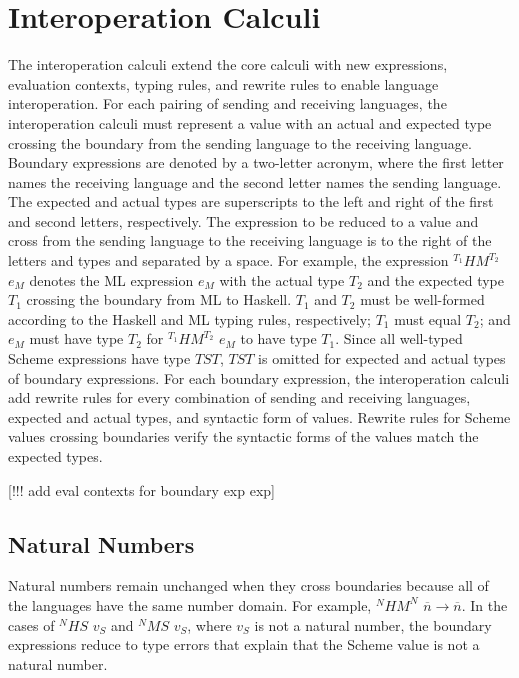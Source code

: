 









\section{Interoperation Calculi}

The interoperation calculi extend the core calculi with new expressions, evaluation contexts, typing rules, and rewrite rules to enable language interoperation.  For each pairing of sending and receiving languages, the interoperation calculi must represent a value with an actual and expected type crossing the boundary from the sending language to the receiving language.  Boundary expressions are denoted by a two-letter acronym, where the first letter names the receiving language and the second letter names the sending language.  The expected and actual types are superscripts to the left and right of the first and second letters, respectively.  The expression to be reduced to a value and cross from the sending language to the receiving language is to the right of the letters and types and separated by a space.  For example, the expression $^{T_{1}}HM^{T_{2}}$ $e_{M}$ denotes the ML expression $e_{M}$ with the actual type $T_{2}$ and the expected type $T_{1}$ crossing the boundary from ML to Haskell.  $T_{1}$ and $T_{2}$ must be well-formed according to the Haskell and ML typing rules, respectively; $T_{1}$ must equal $T_{2}$; and $e_{M}$ must have type $T_{2}$ for $^{T_{1}}HM^{T_{2}}$ $e_{M}$ to have type $T_{1}$.  Since all well-typed Scheme expressions have type $TST$, $TST$ is omitted for expected and actual types of boundary expressions.  For each boundary expression, the interoperation calculi add rewrite rules for every combination of sending and receiving languages, expected and actual types, and syntactic form of values.  Rewrite rules for Scheme values crossing boundaries verify the syntactic forms of the values match the expected types.

[!!! add eval contexts for boundary exp exp]

\subsection{Natural Numbers}

Natural numbers remain unchanged when they cross boundaries because all of the languages have the same number domain.  For example, $^{N}HM^{N}$ $\overline{n}\rightarrow\overline{n}$.  In the cases of $^{N}HS$ $v_{S}$ and $^{N}MS$ $v_{S}$, where $v_{S}$ is not a natural number, the boundary expressions reduce to type errors that explain that the Scheme value is not a natural number.

